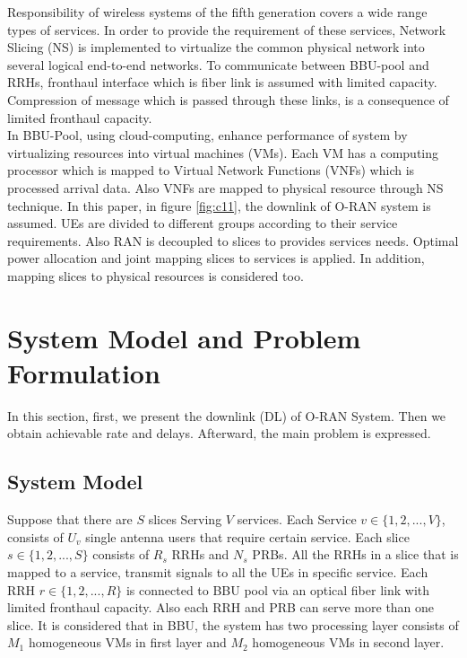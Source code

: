 \documentclass[conference]{IEEEtran}
\begin{document}
Responsibility of wireless systems of the fifth generation covers a wide range types of services. In order to provide the requirement of these services, Network Slicing (NS) is implemented to virtualize the common physical network into several logical end-to-end networks. \newline
To communicate between BBU-pool and RRHs, fronthaul interface which is fiber link is assumed with limited capacity. Compression of message which is passed through these links, is a consequence of limited fronthaul capacity.\\
In BBU-Pool, using cloud-computing, enhance performance of system by virtualizing resources
into virtual machines (VMs).
Each VM has a computing processor which is mapped to Virtual Network Functions (VNFs) which is processed arrival data. Also VNFs are mapped to physical resource through NS technique. \newline
In this paper, in figure \eqref{fig:c11}, the downlink of O-RAN system is assumed. UEs are divided to different groups according to 
their service requirements. Also RAN is decoupled to slices to provides services needs. Optimal power allocation and joint mapping slices to services is applied. In addition, mapping slices to physical resources is considered too.
\section{System Model and Problem Formulation}
In this section, first, we present the downlink (DL) of O-RAN System. Then we obtain achievable rate and delays.
Afterward, the main problem is expressed.
\subsection{System Model}
Suppose that there are $S$ slices Serving $V$ services. Each Service $v\in \{1,2,...,V \} $, consists of $U_v$ single antenna users that require certain service. Each slice $s \in \{1,2,...,S \}$ consists of $R_s$ RRHs and $N_s$ PRBs. All the RRHs in a slice that is mapped to a service, transmit signals to all the UEs in specific service. Each RRH $r \in \{1,2,...,R \}$ is connected to BBU pool via an optical fiber link with limited fronthaul capacity. Also each RRH and PRB can serve more than one slice. It is considered that in BBU, the system has two processing layer consists of $M_1$ homogeneous VMs in first layer and $M_2$ homogeneous VMs in second layer.
\end{document}
